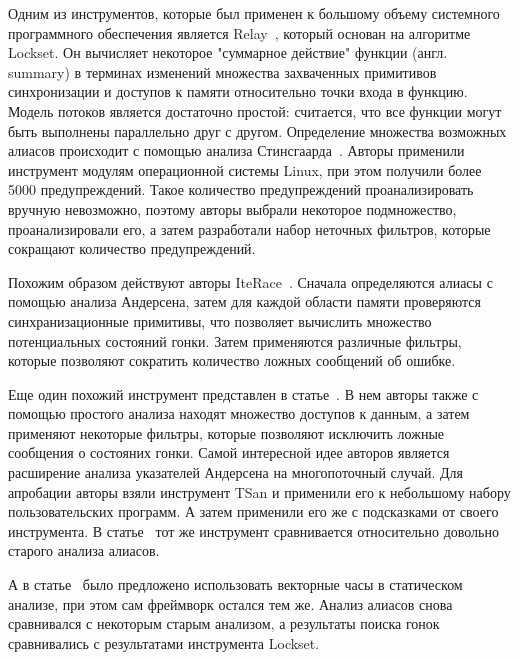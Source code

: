 Одним из инструментов, которые был применен к большому объему системного программного обеспечения является Relay~\cite{Relay}, который основан на алгоритме Lockset.
Он вычисляет некоторое "суммарное действие" функции (англ. summary) в терминах изменений множества захваченных примитивов синхронизации и доступов к памяти относительно точки входа в функцию.
Модель потоков является достаточно простой: считается, что все функции могут быть выполнены параллельно друг с другом.
Определение множества возможных алиасов происходит с помощью анализа Стинсгаарда~\cite{Steensgaard:1996}.
Авторы применили инструмент модулям операционной системы Linux, при этом получили более 5000 предупреждений.
Такое количество предупреждений проанализировать вручную невозможно, поэтому авторы выбрали некоторое подмножество, проанализировали его, а затем разработали набор неточных фильтров, которые сокращают количество предупреждений.

Похожим образом действуют авторы IteRace~\cite{Radoi:2015:ETS}.
Сначала определяются алиасы с помощью анализа Андерсена, затем для каждой области памяти проверяются синхранизационные примитивы, что позволяет вычислить множество потенциальных состояний гонки.
Затем применяются различные фильтры, которые позволяют сократить количество ложных сообщений об ошибке.

Еще один похожий инструмент представлен в статье~\cite{Di:2016:ADD}.
В нем авторы также с помощью простого анализа находят множество доступов к данным, а затем применяют некоторые фильтры, которые позволяют исключить ложные сообщения о состояних гонки.
Самой интересной идее авторов является расширение анализа указателей Андерсена на многопоточный случай.
Для апробации авторы взяли инструмент TSan и применили его к небольшому набору пользовательских программ. 
А затем применили его же с подсказками от своего инструмента. 
В статье~\cite{Sui:2016} тот же инструмент сравнивается относительно довольно старого анализа алиасов.

А в статье~\cite{Zhou:2018} было предложено использовать векторные часы в статическом анализе, при этом сам фреймворк остался тем же.
Анализ алиасов снова сравнивался с некоторым старым анализом, а результаты поиска гонок сравнивались с результатами инструмента Lockset.


